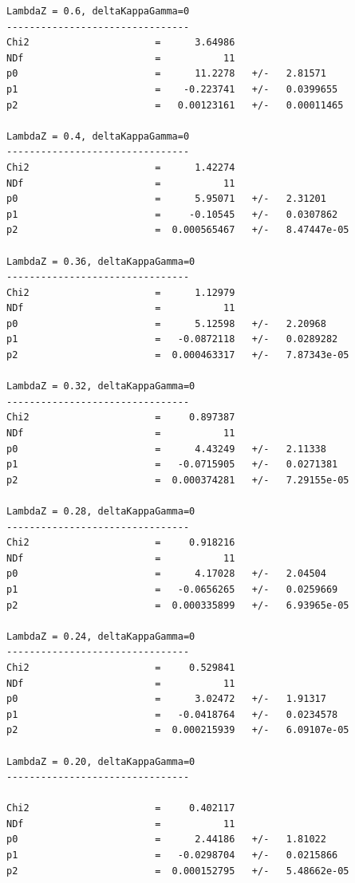\begin{verbatim}
LambdaZ = 0.6, deltaKappaGamma=0
--------------------------------
Chi2                      =      3.64986
NDf                       =           11
p0                        =      11.2278   +/-   2.81571     
p1                        =    -0.223741   +/-   0.0399655   
p2                        =   0.00123161   +/-   0.00011465  

LambdaZ = 0.4, deltaKappaGamma=0
--------------------------------
Chi2                      =      1.42274
NDf                       =           11
p0                        =      5.95071   +/-   2.31201     
p1                        =     -0.10545   +/-   0.0307862   
p2                        =  0.000565467   +/-   8.47447e-05 

LambdaZ = 0.36, deltaKappaGamma=0
--------------------------------
Chi2                      =      1.12979
NDf                       =           11
p0                        =      5.12598   +/-   2.20968     
p1                        =   -0.0872118   +/-   0.0289282   
p2                        =  0.000463317   +/-   7.87343e-05 

LambdaZ = 0.32, deltaKappaGamma=0
--------------------------------
Chi2                      =     0.897387
NDf                       =           11
p0                        =      4.43249   +/-   2.11338     
p1                        =   -0.0715905   +/-   0.0271381   
p2                        =  0.000374281   +/-   7.29155e-05 

LambdaZ = 0.28, deltaKappaGamma=0
--------------------------------
Chi2                      =     0.918216
NDf                       =           11
p0                        =      4.17028   +/-   2.04504     
p1                        =   -0.0656265   +/-   0.0259669   
p2                        =  0.000335899   +/-   6.93965e-05 

LambdaZ = 0.24, deltaKappaGamma=0
--------------------------------
Chi2                      =     0.529841
NDf                       =           11
p0                        =      3.02472   +/-   1.91317     
p1                        =   -0.0418764   +/-   0.0234578   
p2                        =  0.000215939   +/-   6.09107e-05 

LambdaZ = 0.20, deltaKappaGamma=0
--------------------------------

Chi2                      =     0.402117
NDf                       =           11
p0                        =      2.44186   +/-   1.81022     
p1                        =   -0.0298704   +/-   0.0215866   
p2                        =  0.000152795   +/-   5.48662e-05 


\end{verbatim}
